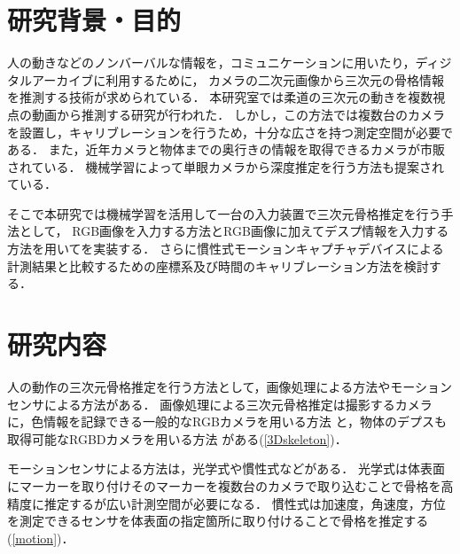 \documentclass[titlepage]{jarticle}
\begin{document}
\maketitle

\section{研究背景・目的}
人の動きなどのノンバーバルな情報を，コミュニケーションに用いたり，ディジタルアーカイブに利用するために，
カメラの二次元画像から三次元の骨格情報を推測する技術が求められている．
本研究室では柔道の三次元の動きを複数視点の動画から推測する研究\cite{turugi}が行われた．
しかし，この方法では複数台のカメラを設置し，キャリブレーションを行うため，十分な広さを持つ測定空間が必要である．
また，近年カメラと物体までの奥行きの情報を取得できるカメラが市販されている．
機械学習によって単眼カメラから深度推定を行う方法も提案されている\cite{depth}．

そこで本研究では機械学習を活用して一台の入力装置で三次元骨格推定を行う手法として，
RGB画像を入力する方法とRGB画像に加えてデスプ情報を入力する方法を用いてを実装する．
さらに慣性式モーションキャプチャデバイスによる計測結果と比較するための座標系及び時間のキャリブレーション方法を検討する．
\section{研究内容}
%
人の動作の三次元骨格推定を行う方法として，画像処理による方法やモーションセンサによる方法がある．%
画像処理による三次元骨格推定は撮影するカメラに，色情報を記録できる一般的なRGBカメラを用いる方法
と，物体のデプスも取得可能なRGBDカメラを用いる方法
がある(\ref{3Dskeleton})．

モーションセンサによる方法は，光学式や慣性式などがある．
光学式は体表面にマーカーを取り付けそのマーカーを複数台のカメラで取り込むことで骨格を高精度に推定するが広い計測空間が必要になる．
慣性式は加速度，角速度，方位を測定できるセンサを体表面の指定箇所に取り付けることで骨格を推定する(\ref{motion})．

\end{document}
